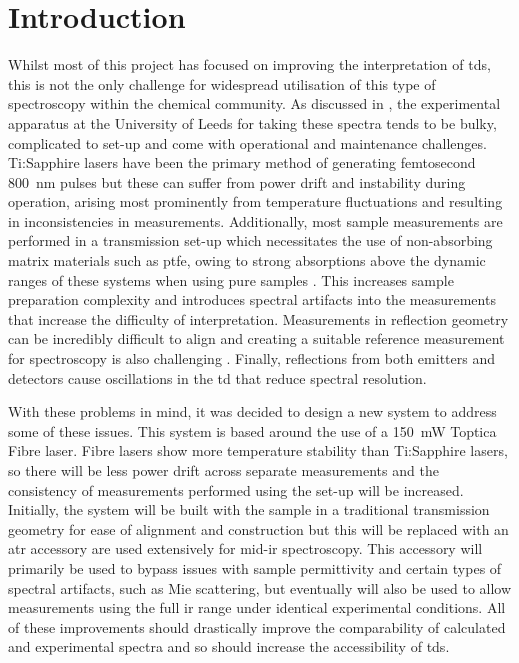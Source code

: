 \section{Introduction}
Whilst most of this project has focused on improving the interpretation of \acrshort{tds}, this is not the only challenge for widespread utilisation of this type of spectroscopy within the chemical community. As discussed in , the experimental apparatus at the University of Leeds for taking these spectra tends to be bulky, complicated to set\nobreakdash-up and come with operational and maintenance challenges. Ti:Sapphire lasers have been the primary method of generating femtosecond \SI{800}{nm} pulses \DIFdelbegin \DIFdel{~}\DIFdelend \cite{Druon2007} but these can suffer from power drift and instability during operation, arising most prominently from temperature fluctuations and resulting in inconsistencies in measurements. Additionally, most sample measurements are performed in a transmission set\nobreakdash-up which necessitates the use of non\nobreakdash-absorbing matrix materials such as \acrshort{ptfe}, owing to strong absorptions above the dynamic ranges of these systems when using pure samples \DIFdelbegin \DIFdel{~}\DIFdelend \cite{Zeitler2016, Smith2011, Murphy2022}. This increases sample preparation complexity and introduces spectral artifacts into the measurements that increase the difficulty of interpretation. Measurements in reflection geometry can be incredibly difficult to align and creating a suitable reference measurement for spectroscopy is also challenging \DIFdelbegin \DIFdel{~}\DIFdelend \cite{Smith2011}. Finally, reflections from both emitters and detectors cause oscillations in the \acrshort{td} that reduce spectral resolution.

With these problems in mind, it was decided to design a new system to address some of these issues. This system is based around the use of a \SI{150}{mW} Toptica Fibre laser. Fibre lasers show more temperature stability than Ti:Sapphire lasers, so there will be less power drift across separate measurements and the consistency of measurements performed using the set\nobreakdash-up will be increased. Initially, the system will be built with the sample in a traditional transmission geometry for ease of alignment and construction but this will be replaced with an \acrfull{atr} accessory \DIFdelbegin {}\DIFdelend \DIFaddbegin {}\DIFaddend are used extensively for mid\nobreakdash-\acrshort{ir} spectroscopy. This accessory will primarily be used to bypass issues with sample permittivity and certain types of spectral artifacts, such as Mie scattering, but eventually will also be used to allow measurements using the full \acrshort{ir} range under identical experimental conditions. All of these improvements should drastically improve the comparability of calculated and experimental spectra and so should increase the accessibility of \acrshort{tds}. 


